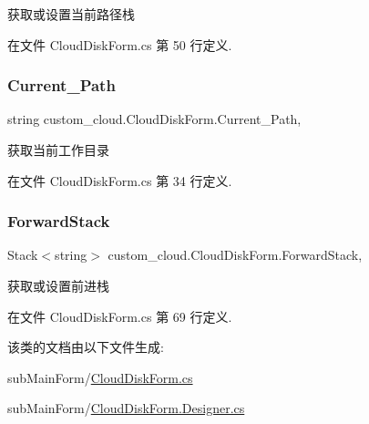 获取或设置当前路径栈 



在文件 Cloud\+Disk\+Form.\+cs 第 50 行定义.

\mbox{\label{classcustom__cloud_1_1_cloud_disk_form_ac51f41eb78c27ed50ea7d3151eb441c4}} 
\subsubsection{\texorpdfstring{Current\+\_\+\+Path}{Current\_Path}}
{\footnotesize\ttfamily string custom\+\_\+cloud.\+Cloud\+Disk\+Form.\+Current\+\_\+\+Path\hspace{0.3cm}{\ttfamily [get]}, {\ttfamily [set]}}



获取当前工作目录 



在文件 Cloud\+Disk\+Form.\+cs 第 34 行定义.

\mbox{\label{classcustom__cloud_1_1_cloud_disk_form_a6a6a9bf7c200971684e8b2e68e97ed4d}} 
\subsubsection{\texorpdfstring{Forward\+Stack}{ForwardStack}}
{\footnotesize\ttfamily Stack$<$string$>$ custom\+\_\+cloud.\+Cloud\+Disk\+Form.\+Forward\+Stack\hspace{0.3cm}{\ttfamily [get]}, {\ttfamily [set]}}



获取或设置前进栈 



在文件 Cloud\+Disk\+Form.\+cs 第 69 行定义.



该类的文档由以下文件生成\+:\begin{DoxyCompactItemize}
\item 
sub\+Main\+Form/\hyperlink{_cloud_disk_form_8cs}{Cloud\+Disk\+Form.\+cs}\item 
sub\+Main\+Form/\hyperlink{_cloud_disk_form_8_designer_8cs}{Cloud\+Disk\+Form.\+Designer.\+cs}\end{DoxyCompactItemize}

